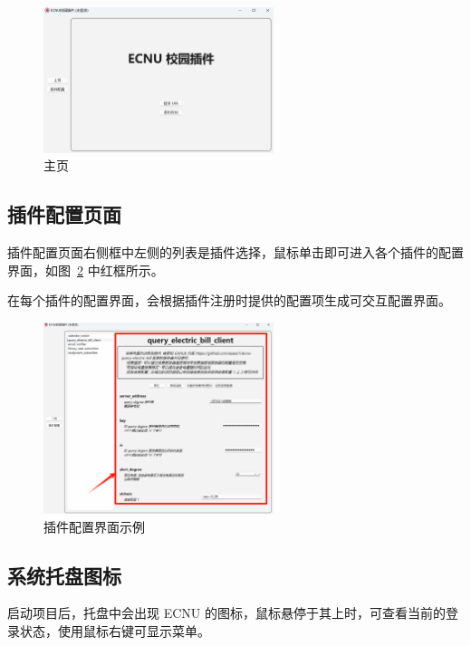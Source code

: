 \documentclass[14pt,a4paper,UTF8,twoside]{article}
\begin{document}
\begin{figure}[H]
    \centering
    \includegraphics[width=0.6\textwidth]{img/home}
    \caption{主页}
    \label{fig:home}
\end{figure}

\subsection{插件配置页面}\label{subsubsec:gui-plugin-config}

插件配置页面右侧框中左侧的列表是插件选择，鼠标单击即可进入各个插件的配置界面，如图\ \ref{fig:plugin-config-gui} 中红框所示。

在每个插件的配置界面，会根据插件注册时提供的配置项生成可交互配置界面。

\begin{figure}[H]
    \centering
    \includegraphics[width=0.6\textwidth]{img/plugin_config_gui}
    \caption{插件配置界面示例}
    \label{fig:plugin-config-gui}
\end{figure}

\subsection{系统托盘图标}

启动项目后，托盘中会出现 ECNU 的图标，鼠标悬停于其上时，可查看当前的登录状态，使用鼠标右键可显示菜单。
\end{document}
